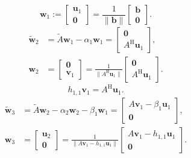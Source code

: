 \[\bm w_1:=\begin{bmatrix}\bm u_1\\\bm0\end{bmatrix}=\frac1{\|\bm b\|}\begin{bmatrix}\bm b\\\bm0\end{bmatrix}.\]
\[\begin{aligned}\widetilde{\bm w}_2&=\widetilde A\bm w_1-\alpha_1\bm w_1=\begin{bmatrix}\bm0\\A^{\mathrm H}\bm u_1\end{bmatrix},\\
\bm w_2&=\begin{bmatrix}\bm0\\\bm v_1\end{bmatrix}=\frac1{\|A^{\mathrm H}\bm u_1\|}\begin{bmatrix}\bm0\\A^{\mathrm H}\bm u_1\end{bmatrix}.\end{aligned}\]
\begin{equation}\label{eq:golub-kahan-first-adjoint}h_{1,1}\bm v_1=A^{\mathrm H}\bm u_1.\end{equation}
\[\begin{aligned}\widetilde{\bm w}_3&=\widetilde A\bm w_2-\alpha_2\bm w_2-\beta_1\bm w_1=\begin{bmatrix}A\bm v_1-\beta_1\bm u_1\\\bm0\end{bmatrix},\\
\bm w_3&=\begin{bmatrix}\bm u_2\\\bm0\end{bmatrix}=\frac1{\|A\bm v_1-h_{1,1}\bm u_1\|}\begin{bmatrix}A\bm v_1-h_{1,1}\bm u_1\\\bm0\end{bmatrix}.\end{aligned}\]
